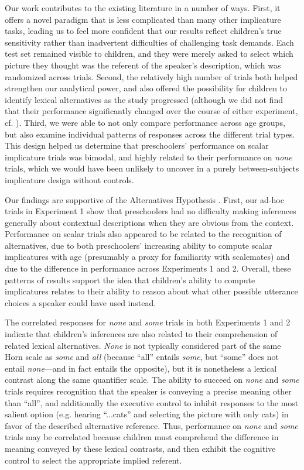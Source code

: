 \documentclass[10pt,letterpaper]{article}
\begin{document}
Our work contributes to the existing literature in a number of ways. First, it offers a novel paradigm that is less complicated than many other implicature tasks, leading us to feel more confident that our results reflect children's true sensitivity rather than inadvertent difficulties of challenging task demands. Each test set remained visible to children, and they were merely asked to select which picture they thought was the referent of the speaker's description, which was randomized across trials. Second, the relatively high number of trials both helped strengthen our analytical power, and also offered the possibility for children to identify lexical alternatives as the study progressed (although we did not find that their performance significantly changed over the course of either experiment, cf. \cite{skordos2014}). Third, we were able to not only compare performance across age groups, but also examine individual patterns of responses across the different trial types. This design helped us determine that preschoolers' performance on scalar implicature trials was bimodal, and highly related to their performance on \emph{none} trials, which we would have been unlikely to uncover in a purely between-subjects implicature design without controls. 

Our findings are supportive of the Alternatives Hypothesis \citep{barner2010,barner2011}. First, our ad-hoc trials in Experiment 1 show that preschoolers had no difficulty making inferences generally about contextual descriptions when they are obvious from the context. Performance on scalar trials also appeared to be related to the recognition of alternatives, due to both preschoolers' increasing ability to compute scalar implicatures with age (presumably a proxy for familiarity with scalemates) and due to the difference in performance across Experiments 1 and 2. Overall, these patterns of results support the idea that children's ability to compute implicatures relates to their ability to reason about what other possible utterance choices a speaker could have used instead.  


The correlated responses for \emph{none} and \emph{some} trials in both Experiments 1 and 2 indicate that children's inferences are also related to their comprehension of related lexical alternatives. \emph{None} is not typically considered part of the same Horn scale as \emph{some} and \emph{all} (because ``all'' entails \emph{some}, but ``some'' does not entail \emph{none}---and in fact entails the opposite), but it is nonetheless a lexical contrast along the same quantifier scale. 
The ability to succeed on \emph{none} and \emph{some} trials requires recognition that the speaker is conveying a precise meaning other than ``all'', and additionally the executive control to inhibit responses to the most salient option (e.g. hearing ``...cats'' and selecting the picture with only cats) in favor of the described alternative reference.  Thus, performance on \emph{none} and \emph{some} trials may be correlated because children must comprehend the difference in meaning conveyed by these lexical contrasts, and then exhibit the cognitive control to select the appropriate implied referent. 
\end{document}

